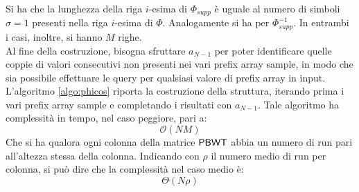 Si ha che la lunghezza della riga $i$-esima di $\varPhi_{supp}$ è
uguale al numero di simboli $\sigma=1$ presenti nella riga $i$-esima di
$\varPhi$. Analogamente 
si ha per $\varPhi^{-1}_{supp}$. In entrambi i casi, inoltre, si hanno $M$
righe.\\ 
Al fine della costruzione, bisogna sfruttare $a_{N-1}$ per poter
identificare quelle coppie di valori consecutivi non presenti nei vari
prefix array sample, in modo che sia possibile effettuare le query per
qualsiasi valore di prefix array in input.\\
L'algoritmo \ref{algo:phicos} riporta la costruzione della struttura,
iterando prima i vari prefix array sample e completando i
risultati con $a_{N-1}$. Tale algoritmo ha complessità in tempo, nel caso
peggiore, pari a:
\begin{equation}
  \label{eq:phicos}
  \mathcal{O}(NM)
\end{equation}
Che si ha qualora ogni colonna della matrice $\mbox{\rm {\sf PBWT}}$ abbia un numero di
run pari all'altezza stessa della colonna. Indicando con $\rho$ il numero medio
di run per colonna, si può dire che la complessità nel caso medio è:
\begin{equation}
  \label{eq:phicos2}
  \varTheta(N\rho)
\end{equation}
